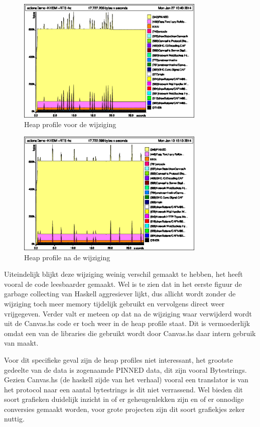 \begin{figure}
\begin{center}
\includegraphics[keepaspectratio,width=0.8\textwidth]{./images/actionsDemoBeforeByteStrings.eps}
\caption{Heap profile voor de wijziging}
\label{fig:sub1}
\end{center}
\end{figure}

\begin{figure}
\begin{center}
\includegraphics[keepaspectratio,width=0.8\textwidth]{./images/actionsDemoAfterByteStrings.eps}
\caption{Heap profile na de wijziging}
\label{fig:sub1}
\end{center}
\end{figure}

Uiteindelijk blijkt deze wijziging weinig verschil gemaakt te hebben, het heeft vooral de code leesbaarder gemaakt. Wel is te zien dat in het eerste figuur de garbage collecting van Haskell aggresiever lijkt, dus allicht wordt zonder de wijziging toch meer memory tijdelijk gebruikt en vervolgens direct weer vrijgegeven. Verder valt er meteen op dat na de wijziging waar  verwijderd wordt uit de Canvas.hs code er toch weer  in de heap profile staat. Dit is vermoederlijk omdat een van de libraries die gebruikt wordt door Canvas.hs daar intern gebruik van maakt.

Voor dit specifieke geval zijn de heap profiles niet interessant, het grootste gedeelte van de data is zogenaamde PINNED data, dit zijn vooral Bytestrings. Gezien Canvas.hs (de haskell zijde van het verhaal) vooral een translator is van het protocol naar een aantal bytestrings is dit niet verrassend. Wel bieden dit soort grafieken duidelijk inzicht in of er geheugenlekken zijn en of er onnodige conversies gemaakt worden, voor grote projecten zijn dit soort grafiekjes zeker nuttig.
